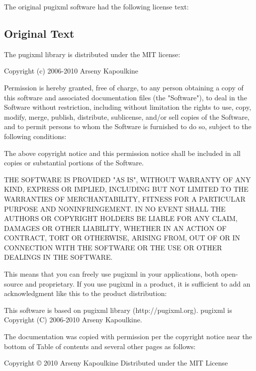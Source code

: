 The original pugixml software had the following license text: \hypertarget{OriginalpugixmlLicense_pugixmloriginallicense}{}\subsection{Original Text}\label{OriginalpugixmlLicense_pugixmloriginallicense}
\begin{DoxyVerb}
    The pugixml library is distributed under the MIT license:

         Copyright (c) 2006-2010 Arseny Kapoulkine

         Permission is hereby granted, free of charge, to any person obtaining a copy of this software
         and associated documentation files (the "Software"), to deal in the Software without restriction,
         including without limitation the rights to use, copy, modify, merge, publish, distribute,
         sublicense, and/or sell copies of the Software, and to permit persons to whom the Software is
         furnished to do so, subject to the following conditions:

         The above copyright notice and this permission notice shall be included in all copies or
         substantial portions of the Software.

         THE SOFTWARE IS PROVIDED "AS IS", WITHOUT WARRANTY OF ANY KIND, EXPRESS OR IMPLIED, INCLUDING
         BUT NOT LIMITED TO THE WARRANTIES OF MERCHANTABILITY, FITNESS FOR A PARTICULAR PURPOSE AND
         NONINFRINGEMENT. IN NO EVENT SHALL THE AUTHORS OR COPYRIGHT HOLDERS BE LIABLE FOR ANY CLAIM,
         DAMAGES OR OTHER LIABILITY, WHETHER IN AN ACTION OF CONTRACT, TORT OR OTHERWISE, ARISING FROM,
         OUT OF OR IN CONNECTION WITH THE SOFTWARE OR THE USE OR OTHER DEALINGS IN THE SOFTWARE.

    This means that you can freely use pugixml in your applications, both open-source and proprietary.
    If you use pugixml in a product, it is sufficient to add an acknowledgment like this to the product
    distribution:

         This software is based on pugixml library (http://pugixml.org).
         pugixml is Copyright (C) 2006-2010 Arseny Kapoulkine.
    \end{DoxyVerb}
 \par
 \par
 The documentation was copied with permission per the copyright notice near the bottom of Table of contents and several other pages as follows: \par
 \par
 \begin{DoxyVerb}
    Copyright © 2010 Arseny Kapoulkine
    Distributed under the MIT License
    \end{DoxyVerb}
 